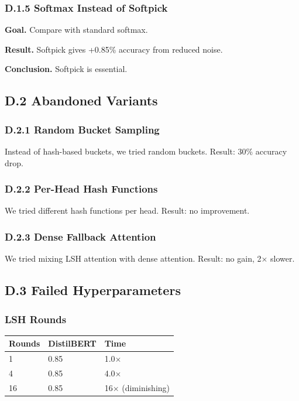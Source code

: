 \subsubsection{D.1.5 Softmax Instead of Softpick}

\textbf{Goal.} Compare with standard softmax.

\textbf{Result.} Softpick gives +0.85\% accuracy from reduced noise.

\textbf{Conclusion.} Softpick is essential.

\subsection{D.2 Abandoned Variants}

\subsubsection{D.2.1 Random Bucket Sampling}

Instead of hash-based buckets, we tried random buckets. Result: 30\% accuracy 
drop.

\subsubsection{D.2.2 Per-Head Hash Functions}

We tried different hash functions per head. Result: no improvement.

\subsubsection{D.2.3 Dense Fallback Attention}

We tried mixing LSH attention with dense attention. Result: no gain, 2$\times$ slower.

\subsection{D.3 Failed Hyperparameters}

\subsubsection{LSH Rounds}

\begin{table}[H]
\centering
\small
\begin{tabular}{lll}
\toprule
\textbf{Rounds} & \textbf{DistilBERT} & \textbf{Time} \\
\midrule
1 & 0.85 & 1.0$\times$ \\
4 & 0.85 & 4.0$\times$ \\
16 & 0.85 & 16$\times$ (diminishing) \\
\bottomrule
\end{tabular}
\end{table}

